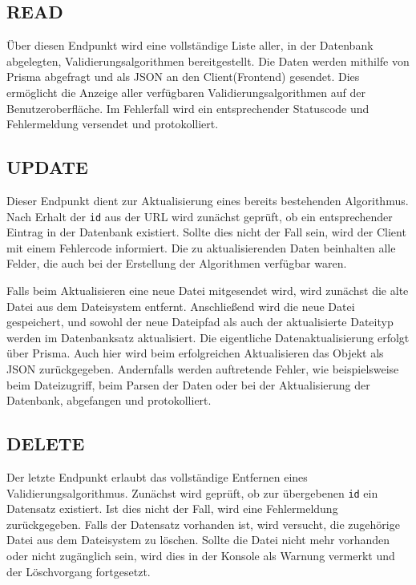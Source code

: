 \subsection{READ}


Über diesen Endpunkt wird eine vollständige Liste aller, in der Datenbank abgelegten, Validierungsalgorithmen bereitgestellt. Die Daten werden mithilfe von Prisma abgefragt und als JSON an den Client(Frontend) gesendet. Dies ermöglicht die Anzeige aller verfügbaren Validierungsalgorithmen auf der Benutzeroberfläche. Im Fehlerfall wird ein entsprechender Statuscode und Fehlermeldung versendet und protokolliert.

\subsection{UPDATE}


Dieser Endpunkt dient zur Aktualisierung eines bereits bestehenden Algorithmus. Nach Erhalt der \texttt{id} aus der URL wird zunächst geprüft, ob ein entsprechender Eintrag in der Datenbank existiert. Sollte dies nicht der Fall sein, wird der Client mit einem Fehlercode informiert. Die zu aktualisierenden Daten beinhalten alle Felder, die auch bei der Erstellung der Algorithmen verfügbar waren.

Falls beim Aktualisieren eine neue Datei mitgesendet wird, wird zunächst die alte Datei aus dem Dateisystem entfernt. Anschließend wird die neue Datei gespeichert, und sowohl der neue Dateipfad als auch der aktualisierte Dateityp werden im Datenbanksatz aktualisiert. Die eigentliche Datenaktualisierung erfolgt über Prisma. Auch hier wird beim erfolgreichen Aktualisieren das Objekt als JSON zurückgegeben. Andernfalls werden auftretende Fehler, wie beispielsweise beim Dateizugriff, beim Parsen der Daten oder bei der Aktualisierung der Datenbank, abgefangen und protokolliert.

\subsection{DELETE}


Der letzte Endpunkt erlaubt das vollständige Entfernen eines Validierungsalgorithmus. Zunächst wird geprüft, ob zur übergebenen \texttt{id} ein Datensatz existiert. Ist dies nicht der Fall, wird eine Fehlermeldung zurückgegeben. Falls der Datensatz vorhanden ist, wird versucht, die zugehörige Datei aus dem Dateisystem zu löschen. Sollte die Datei nicht mehr vorhanden oder nicht zugänglich sein, wird dies in der Konsole als Warnung vermerkt und der Löschvorgang fortgesetzt.

